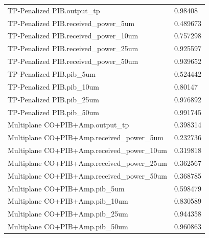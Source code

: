 \begin{longtable}{p{}p{}}
TP-Penalized PIB.output\_tp & 0.98408\\
TP-Penalized PIB.received\_power\_5um & 0.489673\\
TP-Penalized PIB.received\_power\_10um & 0.757298\\
TP-Penalized PIB.received\_power\_25um & 0.925597\\
TP-Penalized PIB.received\_power\_50um & 0.939652\\
TP-Penalized PIB.pib\_5um & 0.524442\\
TP-Penalized PIB.pib\_10um & 0.80147\\
TP-Penalized PIB.pib\_25um & 0.976892\\
TP-Penalized PIB.pib\_50um & 0.991745\\
Multiplane CO+PIB+Amp.output\_tp & 0.398314\\
Multiplane CO+PIB+Amp.received\_power\_5um & 0.232736\\
Multiplane CO+PIB+Amp.received\_power\_10um & 0.319818\\
Multiplane CO+PIB+Amp.received\_power\_25um & 0.362567\\
Multiplane CO+PIB+Amp.received\_power\_50um & 0.368785\\
Multiplane CO+PIB+Amp.pib\_5um & 0.598479\\
Multiplane CO+PIB+Amp.pib\_10um & 0.830589\\
Multiplane CO+PIB+Amp.pib\_25um & 0.944358\\
Multiplane CO+PIB+Amp.pib\_50um & 0.960863\\
\end{longtable}

